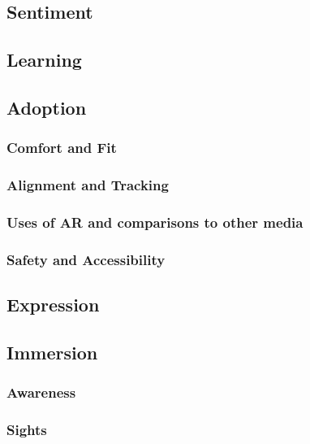 \subsection{Sentiment}\label{sec: polaris-feedback-sentiment}

\subsection{Learning}\label{sec: polaris-feedback-learning}

\subsection{Adoption}\label{sec: polaris-feedback-adoption}
\subsubsection{Comfort and Fit}\label{sec: polaris-feedback-adoption-comfort}
\subsubsection{Alignment and Tracking}\label{sec: polaris-feedback-adoption-alignment}
\subsubsection{Uses of AR and comparisons to other media}\label{sec: polaris-feedback-adoption-uses}
\subsubsection{Safety and Accessibility}\label{sec: polaris-feedback-adoption-safety}

\subsection{Expression}\label{sec: polaris-feedback-expression}

\subsection{Immersion}\label{sec: polaris-feedback-immersion}
\subsubsection{Awareness}\label{sec: polaris-feedback-immersion-awareness}
\subsubsection{Sights}\label{sec: polaris-feedback-immersion-sights}
